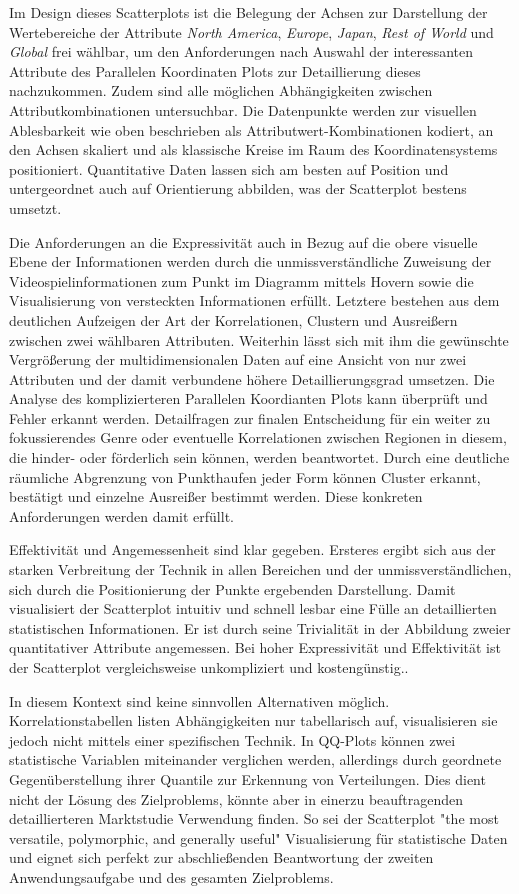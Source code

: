 \documentclass[usegeometry=true]{scrartcl}
\begin{document}
Im Design dieses Scatterplots ist die Belegung der Achsen zur Darstellung der Wertebereiche der Attribute \textit{North America}, \textit{Europe}, \textit{Japan}, \textit{Rest of World} und \textit{Global} frei wählbar, 
um den Anforderungen nach Auswahl der interessanten Attribute des Parallelen Koordinaten Plots zur Detaillierung dieses nachzukommen.
Zudem sind alle möglichen Abhängigkeiten zwischen Attributkombinationen untersuchbar. 
Die Datenpunkte werden zur visuellen Ablesbarkeit wie oben beschrieben als Attributwert-Kombinationen kodiert, 
an den Achsen skaliert und als klassische Kreise im Raum des Koordinatensystems positioniert. 
Quantitative Daten lassen sich am besten auf Position und untergeordnet auch auf Orientierung abbilden, 
was der Scatterplot bestens umsetzt.\cite{Bertin.1982}

Die Anforderungen an die Expressivität auch in Bezug auf die obere visuelle Ebene der Informationen werden durch die unmissverständliche Zuweisung der Videospielinformationen zum Punkt im Diagramm mittels Hovern sowie die Visualisierung von 
versteckten Informationen erfüllt. 
Letztere bestehen aus dem deutlichen Aufzeigen der Art der Korrelationen, Clustern und Ausreißern zwischen zwei wählbaren Attributen.
Weiterhin lässt sich mit ihm die gewünschte Vergrößerung der multidimensionalen Daten auf eine Ansicht von nur zwei Attributen und der damit verbundene höhere Detaillierungsgrad umsetzen. 
Die Analyse des komplizierteren Parallelen Koordianten Plots kann überprüft und Fehler erkannt werden. 
Detailfragen zur finalen Entscheidung für ein weiter zu fokussierendes Genre oder eventuelle Korrelationen zwischen Regionen in diesem, 
die hinder- oder förderlich sein können, werden beantwortet. 
Durch eine deutliche räumliche Abgrenzung von Punkthaufen jeder Form können Cluster erkannt, bestätigt und einzelne Ausreißer bestimmt werden.
Diese konkreten Anforderungen werden damit erfüllt.

Effektivität und Angemessenheit sind klar gegeben. 
Ersteres ergibt sich aus der starken Verbreitung der Technik in allen Bereichen und der unmissverständlichen, sich durch die Positionierung der Punkte ergebenden Darstellung. 
Damit visualisiert der Scatterplot intuitiv und schnell lesbar eine Fülle an detaillierten statistischen Informationen.
Er ist durch seine Trivialität in der Abbildung zweier quantitativer Attribute angemessen. 
Bei hoher Expressivität und Effektivität ist der Scatterplot vergleichsweise unkompliziert und kostengünstig..

In diesem Kontext sind keine sinnvollen Alternativen möglich. 
Korrelationstabellen listen Abhängigkeiten nur tabellarisch auf, visualisieren sie jedoch nicht mittels einer spezifischen Technik.
In QQ-Plots können zwei statistische Variablen miteinander verglichen werden, allerdings durch geordnete Gegenüberstellung ihrer Quantile zur Erkennung von Verteilungen.
Dies dient nicht der Lösung des Zielproblems, könnte aber in einerzu beauftragenden detaillierteren Marktstudie Verwendung finden.
So sei der Scatterplot "the most versatile, polymorphic, and generally useful"\cite[103]{Friendly.2005} Visualisierung für statistische Daten und 
eignet sich perfekt zur abschließenden Beantwortung der zweiten Anwendungsaufgabe und des gesamten Zielproblems.
\end{document}
